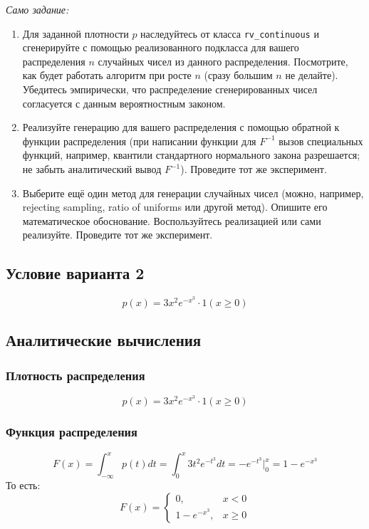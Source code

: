 \documentclass[a4paper,14pt]{extarticle}
\begin{document}
            \textit{Само задание:}
            \begin{enumerate}
                \item Для заданной плотности $p$ наследуйтесь от класса \texttt{rv\_continuous} и сгенерируйте с помощью реализованного подкласса для вашего распределения $n$ случайных чисел из данного распределения. Посмотрите, как будет работать алгоритм при росте $n$ (сразу большим $n$ не делайте). Убедитесь эмпирически, что распределение сгенерированных чисел согласуется с данным вероятностным законом.
                \item Реализуйте генерацию для вашего распределения с помощью обратной к функции распределения (при написании функции для $F^{-1}$ вызов специальных функций, например, квантили стандартного нормального закона разрешается; не забыть аналитический вывод $F^{-1}$). Проведите тот же эксперимент.
                \item Выберите ещё один метод для генерации случайных чисел (можно, например, rejecting sampling, ratio of uniforms или другой метод). Опишите его математическое обоснование. Воспользуйтесь реализацией или сами реализуйте. Проведите тот же эксперимент.
            \end{enumerate}
        
        \subsection*{Условие варианта 2}
            
            \[
                p(x) = 3x^2 e^{-x^3} \cdot 1(x \geq 0)
            \]
        
        \subsection*{Аналитические вычисления}
            
            \subsubsection*{Плотность распределения}
                \[
                    p(x) = 3x^2 e^{-x^3} \cdot 1(x \geq 0)
                \]
            
            \subsubsection*{Функция распределения}
                \[
                    F(x) =
                    \int_{-\infty}^{x} p(t) dt =
                    \int_{0}^{x} 3t^2 e^{-t^3} dt =
                    -e^{-t^3} \Big|_{0}^{x} =
                    1 - e^{-x^3}
                \]
                То есть:
                \[
                    F(x) = \begin{cases}
                               0, & x < 0 \\
                               1 - e^{-x^3}, & x \geq 0
                    \end{cases}
                \]
            
\end{document}
